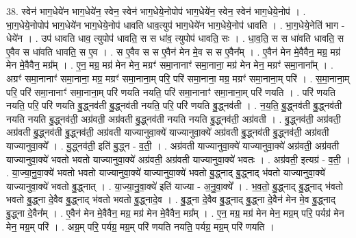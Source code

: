 \documentclass[17pt]{extarticle}
\begin{document}
38. स्वेन॑ भाग॒धेये॑न भाग॒धेये॑न॒ स्वेन॒ स्वेन॑ भाग॒धेये॒नोपोप॑ भाग॒धेये॑न॒ स्वेन॒ स्वेन॑ भाग॒धेये॒नोप॑ । . भा॒ग॒धेये॒नोपोप॑ भाग॒धेये॑न भाग॒धेये॒नोप॑ धावति धाव॒त्युप॑ भाग॒धेये॑न भाग॒धेये॒नोप॑ धावति । . भा॒ग॒धेये॒नेति॑ भाग - धेये॑न । . उप॑ धावति धाव॒ त्युपोप॑ धावति॒ स स धा॑व॒ त्युपोप॑ धावति॒ सः । . धा॒व॒ति॒ स स धा॑वति धावति॒ स ए॒वैव स धा॑वति धावति॒ स ए॒व । . स ए॒वैव स स ए॒वैन॑ मेन मे॒व स स ए॒वैन᳚म् । . ए॒वैन॑ मेन मे॒वैवैन॒ मग्र॒ मग्र॑ मेन मे॒वैवैन॒ मग्र᳚म् । . ए॒न॒ मग्र॒ मग्र॑ मेन मेन॒ मग्रꣳ॑ समा॒नानाꣳ॑ समा॒नाना॒ मग्र॑ मेन मेन॒ मग्रꣳ॑ समा॒नाना᳚म् । . अग्रꣳ॑ समा॒नानाꣳ॑ समा॒नाना॒ मग्र॒ मग्रꣳ॑ समा॒नाना॒म् परि॒ परि॑ समा॒नाना॒ मग्र॒ मग्रꣳ॑ समा॒नाना॒म् परि॑ । . स॒मा॒नाना॒म् परि॒ परि॑ समा॒नानाꣳ॑ समा॒नाना॒म् परि॑ णयति नयति॒ परि॑ समा॒नानाꣳ॑ समा॒नाना॒म् परि॑ णयति । . परि॑ णयति नयति॒ परि॒ परि॑ णयति बु॒द्ध्नव॑ती बु॒द्ध्नव॑ती नयति॒ परि॒ परि॑ णयति बु॒द्ध्नव॑ती । . न॒य॒ति॒ बु॒द्ध्नव॑ती बु॒द्ध्नव॑ती नयति नयति बु॒द्ध्नव॑ती॒ अग्र॑वती॒ अग्र॑वती बु॒द्ध्नव॑ती नयति नयति बु॒द्ध्नव॑ती॒ अग्र॑वती । . बु॒द्ध्नव॑ती॒ अग्र॑वती॒ अग्र॑वती बु॒द्ध्नव॑ती बु॒द्ध्नव॑ती॒ अग्र॑वती याज्यानुवा॒क्ये॑ याज्यानुवा॒क्ये॑ अग्र॑वती बु॒द्ध्नव॑ती बु॒द्ध्नव॑ती॒ अग्र॑वती याज्यानुवा॒क्ये᳚ । . बु॒द्ध्नव॑ती॒ इति॑ बु॒द्ध्न - व॒ती॒ । . अग्र॑वती याज्यानुवा॒क्ये॑ याज्यानुवा॒क्ये॑ अग्र॑वती॒ अग्र॑वती याज्यानुवा॒क्ये॑ भवतो भवतो याज्यानुवा॒क्ये॑ अग्र॑वती॒ अग्र॑वती याज्यानुवा॒क्ये॑ भवतः । . अग्र॑वती॒ इत्यग्र॑ - व॒ती॒ । . या॒ज्या॒नु॒वा॒क्ये॑ भवतो भवतो याज्यानुवा॒क्ये॑ याज्यानुवा॒क्ये॑ भवतो बु॒द्ध्नाद् बु॒द्ध्नाद् भ॑वतो याज्यानुवा॒क्ये॑ याज्यानुवा॒क्ये॑ भवतो बु॒द्ध्नात् । . या॒ज्या॒नु॒वा॒क्ये॑ इति॑ याज्या - अ॒नु॒वा॒क्ये᳚ । . भ॒व॒तो॒ बु॒द्ध्नाद् बु॒द्ध्नाद् भ॑वतो भवतो बु॒द्ध्ना दे॒वैव बु॒द्ध्नाद् भ॑वतो भवतो बु॒द्ध्नादे॒व । . बु॒द्ध्ना दे॒वैव बु॒द्ध्नाद् बु॒द्ध्ना दे॒वैन॑ मेन मे॒व बु॒द्ध्नाद् बु॒द्ध्ना दे॒वैन᳚म् । . ए॒वैन॑ मेन मे॒वैवैन॒ मग्र॒ मग्र॑ मेन मे॒वैवैन॒ मग्र᳚म् । . ए॒न॒ मग्र॒ मग्र॑ मेन मेन॒ मग्र॒म् परि॒ पर्यग्र॑ मेन मेन॒ मग्र॒म् परि॑ । . अग्र॒म् परि॒ पर्यग्र॒ मग्र॒म् परि॑ णयति नयति॒ पर्यग्र॒ मग्र॒म् परि॑ णयति । \newline
\pagebreak
{}
\end{document}
